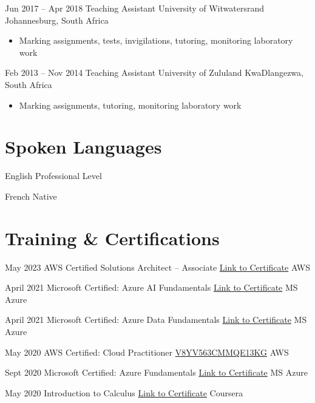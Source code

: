 \documentclass[11pt, letterpaper]{moderncv}        %
\begin{document}
\cventry
{Jun 2017 -- Apr 2018}
{Teaching Assistant}
{University of Witwatersrand}
{Johannesburg, South Africa}
{}
{\begin{itemize}%
	\item Marking assignments, tests, invigilations, tutoring, monitoring laboratory work
	\end{itemize}}
\cventry
{Feb 2013 -- Nov 2014}
{Teaching Assistant}
{University of Zululand}
{KwaDlangezwa, South Africa}
{}
{\begin{itemize}%
	\item Marking assignments, tutoring, monitoring laboratory work
	\end{itemize}}

\section{Spoken Languages}

\cventry
{}
{English}
{Professional Level}
{}
{}
{}

\cventry
{}
{French}
{Native}
{}
{}
{}

\section{Training \& Certifications}

\cventry
{May 2023}
{AWS Certified Solutions Architect – Associate}
{\href{https://www.credly.com/badges/555f8184-5b49-4111-9187-719aad051a58/public_url}{Link to Certificate}}
{AWS}
{}
{}

\cventry
{April 2021}
{Microsoft Certified: Azure AI Fundamentals}
{\href{https://www.credly.com/badges/80d60ce2-32b0-475e-9959-05b452f9355a/public_url}{Link to Certificate}}
{MS Azure}
{}
{}

\cventry
{April 2021}
{Microsoft Certified: Azure Data Fundamentals}
{\href{https://www.credly.com/badges/a08ad4dc-3cee-4771-9183-561a33e3ae81/public_url}{Link to Certificate}}
{MS Azure}
{}
{}

\cventry
{May 2020}
{AWS Certified: Cloud Practitioner}
{\href{http://aws.amazon.com/verification}{V8YV563CMMQE13KG}}
{AWS}
{}
{}

\cventry
{Sept 2020}
{Microsoft Certified: Azure Fundamentals}
{\href{https://www.youracclaim.com/badges/ee4c4a98-5687-4fcf-8fce-7ee92249e54f?source=linked_in_profile}{Link to Certificate}}
{MS Azure}
{}
{}

\cventry
{May 2020}
{Introduction to Calculus}
{\href{https://www.coursera.org/account/accomplishments/verify/VNY949FASZA2}{Link to Certificate}}
{Coursera}
{}
{}
\end{document}
